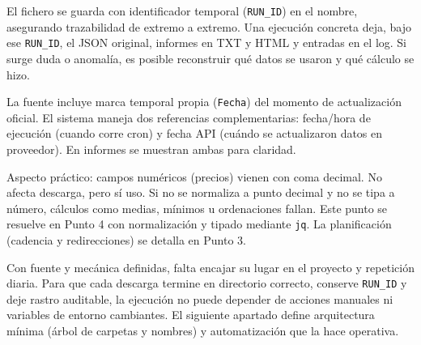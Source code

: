El fichero se guarda con identificador temporal (\texttt{RUN\_ID}) en el nombre, asegurando trazabilidad de extremo a extremo. Una ejecución concreta deja, bajo ese \texttt{RUN\_ID}, el JSON original, informes en TXT y HTML y entradas en el log. Si surge duda o anomalía, es posible reconstruir qué datos se usaron y qué cálculo se hizo.

La fuente incluye marca temporal propia (\texttt{Fecha}) del momento de actualización oficial. El sistema maneja dos referencias complementarias: fecha/hora de ejecución (cuando corre cron) y fecha API (cuándo se actualizaron datos en proveedor). En informes se muestran ambas para claridad.

Aspecto práctico: campos numéricos (precios) vienen con coma decimal. No afecta descarga, pero sí uso. Si no se normaliza a punto decimal y no se tipa a número, cálculos como medias, mínimos u ordenaciones fallan. Este punto se resuelve en Punto 4 con normalización y tipado mediante \texttt{jq}. La planificación (cadencia y redirecciones) se detalla en Punto 3.

Con fuente y mecánica definidas, falta encajar su lugar en el proyecto y repetición diaria. Para que cada descarga termine en directorio correcto, conserve \texttt{RUN\_ID} y deje rastro auditable, la ejecución no puede depender de acciones manuales ni variables de entorno cambiantes. El siguiente apartado define arquitectura mínima (árbol de carpetas y nombres) y automatización que la hace operativa.
